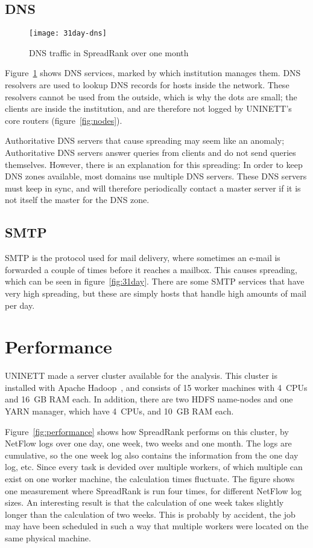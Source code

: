 \subsection{DNS}
\begin{figure}[h!]
	\caption{DNS traffic in SpreadRank over one month}
	\label{fig:31day-dns}
	\centering
		\texttt{[image: 31day-dns]}
\end{figure}

Figure~\ref{fig:31day-dns} shows \gls{DNS} services, marked by which institution manages them.
DNS resolvers are used to lookup DNS records for hosts inside the network.
These resolvers cannot be used from the outside, which is why the dots are small;
 the clients are inside the institution, and are therefore not logged by UNINETT's core routers (figure~\ref{fig:nodes}).

Authoritative DNS servers that cause spreading may seem like an anomaly;
 Authoritative DNS servers answer queries from clients and do not send queries themselves.
However, there is an explanation for this spreading:
In order to keep DNS zones available, most domains use multiple DNS servers.
These DNS servers must keep in sync, and will therefore periodically contact a master server if it is not itself the master for the DNS zone.


\subsection{SMTP}
SMTP is the protocol used for mail delivery, where sometimes an e-mail is forwarded a couple of times before it reaches a mailbox.
This causes spreading, which can be seen in figure~\ref{fig:31day}.
There are some SMTP services that have very high spreading, but these are simply hosts that handle high amounts of mail per day.


\section{Performance}
UNINETT made a server cluster available for the analysis.
This cluster is installed with Apache Hadoop~\cite{Borthakur:2011:AHG:1989323.1989438}, and consists of 15 worker machines with 4~CPUs and 16~GB RAM each.
In addition, there are two HDFS name-nodes and one YARN manager, which have 4~CPUs, and 10~GB RAM each.

Figure~\ref{fig:performance} shows how SpreadRank performs on this cluster,
 by NetFlow logs over one day, one week, two weeks and one month.
The logs are cumulative, so the one week log also contains the information from the one day log, etc.
Since every task is devided over multiple workers, of which multiple can exist on one worker machine,
 the calculation times fluctuate.
The figure shows one measurement where SpreadRank is run four times, for different NetFlow log sizes.
An interesting result is that the calculation of one week takes slightly longer than the calculation of two weeks.
This is probably by accident, the job may have been scheduled in such a way that multiple workers were located on the same physical machine.

